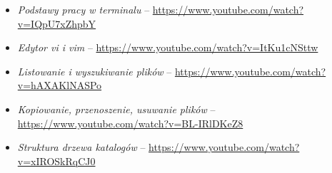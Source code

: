 % 
% 
% 
% 

\begin{itemize}
\item \emph{Podstawy pracy w terminalu} – \url{https://www.youtube.com/watch?v=IQpU7xZhpbY}
\item \emph{Edytor vi i vim} – \url{https://www.youtube.com/watch?v=ItKu1cNSttw}
\item \emph{Listowanie i wyszukiwanie plików} – \url{https://www.youtube.com/watch?v=hAXAKlNASPo}
\item \emph{Kopiowanie, przenoszenie, usuwanie plików} – \url{https://www.youtube.com/watch?v=BL-IRlDKeZ8}
\item \emph{Struktura drzewa katalogów} – \url{https://www.youtube.com/watch?v=xIROSkRqCJ0}
\end{itemize}
